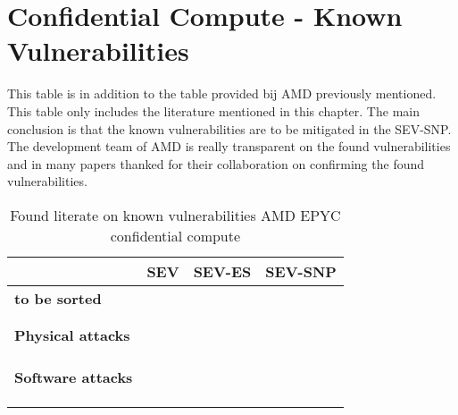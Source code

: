 
\section*{Confidential Compute - Known Vulnerabilities}

This table is in addition to the table provided bij AMD previously mentioned.
This table only includes the literature mentioned in this chapter. 
The main conclusion is that the known vulnerabilities 
are to be mitigated in the SEV-SNP. 
The development team of AMD is really transparent on the found vulnerabilities 
and in many papers thanked for their collaboration 
on confirming the found vulnerabilities. 

\begin{table}[ht]
\label{lit}

\caption{Found literate on known vulnerabilities AMD EPYC confidential compute}
\centering
{
\footnotesize
  \begin{tabular}{|p{3.5cm}|p{3.5cm}|p{3.5cm}|p{3.5cm}|}
    \hline
     & \textbf{SEV} 
     & \textbf{SEV-ES} 
     & \textbf{SEV-SNP}\\
    \hline

    \textbf{to be sorted} 
    & \begin{minipage}[t]{7cm}
        \cite{hetzelt_security_2017}\\
        \cite{du_secure_2017} \\
        \cite{li_tlb_2021}
      \end{minipage}
    & \cite{li_tlb_2021} 
    & 
    \\

    \textbf{Physical attacks} 
    & \begin{minipage}[t]{7cm}
        \cite{li_exploiting_2019} \\
        \cite{buhren_insecure_2019} \\
        \cite{buhren_one_2021}
      \end{minipage}
    & \begin{minipage}[t]{7cm}
        \cite{wilke_sevurity_2020}\\
        \cite{buhren_one_2021} 
      \end{minipage}
    & \cite{buhren_one_2021}
    \\

    \textbf{Software attacks} 
    & \begin{minipage}[t]{7cm}
        \cite{morbitzer_severed_2018} \\
        \cite{2019-werner}\\
        \cite{hetzelt_via_2021}
      \end{minipage}
    & \begin{minipage}[t]{7cm}
        \cite{2019-werner}\\
        \cite{hetzelt_via_2021} 
       \end{minipage}
    & 
    \\


\end{tabular}}
\end{table}
